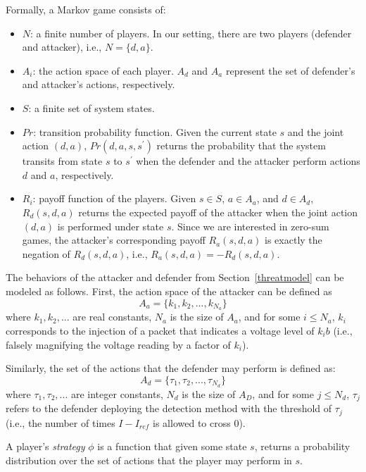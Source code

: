 Formally, a Markov game consists of:
\begin{itemize}
\item $N$: a finite number of players. In our setting, there are two players (defender and attacker), i.e., $N = \{d, a\}$.
\item $A_i$: the action space of each player. $A_d$ and $A_a$ represent the set of defender's and attacker's actions, respectively. 
\item $S$: a finite set of system states. 
\item $Pr$: transition probability function. Given the current state
  $s$ and the joint action $(d, a)$, $Pr(d, a, s, s^\prime)$ returns the probability that the system transits
  from state $s$ to $s^\prime$ when the defender and the attacker perform
  actions $d$ and $a$, respectively.
\item $R_i$: payoff function of the players. Given $s \in S$, $a \in A_a$, and $d \in
  A_d$, $R_d(s, d, a)$ returns the expected payoff of the
  attacker when the joint action $(d, a)$ is performed under state $s$. Since we are
  interested in zero-sum games, the attacker's corresponding payoff $R_a(s, d, a)$ is exactly the negation of $R_d(s, d, a)$, i.e., $R_a(s, d, a) =  - R_d(s, d, a)$.
\end{itemize}

The behaviors of the attacker and defender from
Section~\ref{threatmodel} can be modeled as follows. First, the action
space of the attacker can be defined as
\begin{equation}
A_a = \{ k_1, k_2, ..., k_{N_a} \}
\end{equation}
where $k_1, k_2,...$ are real constants, $N_a$ is the size of $A_a$,
and for some $i \leq N_a$, $k_i$ corresponds to the injection of a
packet that indicates a voltage level of $k_{i}b$ (i.e., falsely
magnifying the voltage reading by a factor of $k_{i}$).

Similarly, the set of the actions that the defender may
perform is defined as:
\begin{equation}
A_d = \{ \tau_1, \tau_2, ..., \tau_{N_d} \}
\end{equation}
where $\tau_1, \tau_2, ...$ are integer constants, $N_d$ is the size
of $A_D$, and for some $j \leq N_d$, $\tau_j$ refers to the
defender deploying the detection method with the threshold of
$\tau_j$ (i.e., the number of times $I - I_{ref}$ is allowed to cross 0). 

A player's \textit{strategy} $\phi$ is a function that given some
state $s$, returns a probability distribution over the set of actions
that the player may perform in $s$.
